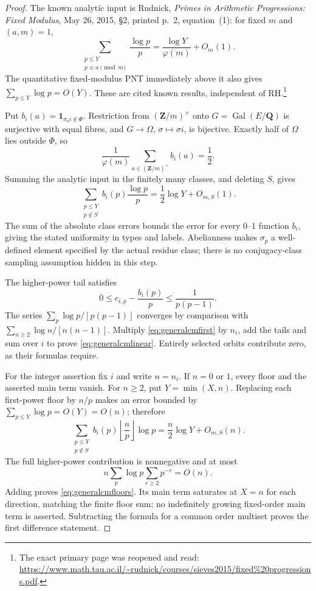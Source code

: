 \documentclass[11pt,a4paper]{article}
\theoremstyle{definition}\newtheorem{remark}[theorem]{Remark}
\begin{document}
\begin{proof}
The known analytic input is Rudnick, \emph{Primes in Arithmetic
Progressions: Fixed Modulus}, May 26, 2015, \S2, printed p.~2,
equation~(1): for fixed $m$ and $(a,m)=1$,
\[
 \sum_{\substack{p\le Y\\p\equiv a\pmod m}}\frac{\log p}{p}
 =\frac{\log Y}{\varphi(m)}+O_m(1).
\]
The quantitative fixed-modulus PNT immediately above it also gives
$\sum_{p\le Y}\log p=O(Y)$.
These are cited known results, independent of RH.\footnote{The exact
primary page was reopened and read:
\url{https://www.math.tau.ac.il/~rudnick/courses/sieves2015/fixed\%20progressions.pdf}.}

Put $b_i(a)=\mathbf1_{\sigma_a i\notin\Phi}$.
Restriction from $(\mathbf Z/m)^\times$ onto
$G=\operatorname{Gal}(E/\mathbf Q)$ is surjective with equal fibres,
and $G\to\Omega$, $\sigma\mapsto\sigma i$, is bijective.
Exactly half of $\Omega$ lies outside $\Phi$, so
\[
 \frac1{\varphi(m)}\sum_{a\in(\mathbf Z/m)^\times}b_i(a)=\frac12.
\]
Summing the analytic input in the finitely many classes, and deleting
$S$, gives
\begin{equation}\label{eq:generalcmfirst}
 \sum_{\substack{p\le Y\\p\notin S}}b_i(p)\frac{\log p}{p}
 =\frac12\log Y+O_{m,S}(1).
\end{equation}
The sum of the absolute class errors bounds the error for every
$0$--$1$ function $b_i$, giving the stated uniformity in types and
labels. Abelianness makes $\sigma_p$ a well-defined element specified
by the actual residue class; there is no conjugacy-class sampling
assumption hidden in this step.

The higher-power tail satisfies
\[
 0\le c_{i,p}-\frac{b_i(p)}p\le\frac1{p(p-1)}.
\]
The series $\sum_p\log p/[p(p-1)]$ converges by comparison with
$\sum_{n\ge2}\log n/[n(n-1)]$.
Multiply \eqref{eq:generalcmfirst} by $n_i$, add the tails and sum
over $i$ to prove \eqref{eq:generalcmlinear}.
Entirely selected orbits contribute zero, as their formulas require.

For the integer assertion fix $i$ and write $n=n_i$.
If $n=0$ or $1$, every floor and the asserted main term vanish.
For $n\ge2$, put $Y=\min(X,n)$.
Replacing each first-power floor by $n/p$ makes an error bounded
by $\sum_{p\le Y}\log p=O(Y)=O(n)$; therefore
\[
 \sum_{\substack{p\le Y\\p\notin S}}
 b_i(p)\left\lfloor\frac np\right\rfloor\log p
 =\frac n2\log Y+O_{m,S}(n).
\]
The full higher-power contribution is nonnegative and at most
\[
 n\sum_p\log p\sum_{r\ge2}p^{-r}=O(n).
\]
Adding proves \eqref{eq:generalcmfloors}.
Its main term saturates at $X=n$ for each direction, matching the
finite floor sum; no indefinitely growing fixed-order main term is
asserted. Subtracting the formula for a common order multiset proves
the first difference statement.


\end{proof}
\end{document}
